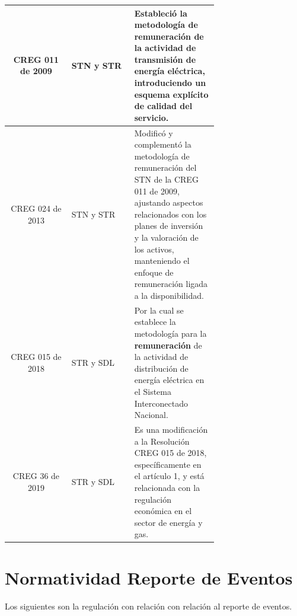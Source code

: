 \documentclass[a5paper]{book}%
\begin{document}
\begin{longtable}{|c|p{0.3\linewidth}|p{0.4\linewidth}|}
	CREG 011 de 2009 &  \ac{STN} y \ac{STR} & Estableció la metodología de remuneración de la actividad de transmisión de energía eléctrica, introduciendo un esquema explícito de calidad del servicio.\\\hline
	
	CREG 024 de 2013 &  \ac{STN} y \ac{STR}  & Modificó y complementó la metodología de remuneración del STN de la CREG 011 de 2009, ajustando aspectos relacionados con los planes de inversión y la valoración de los activos, manteniendo el enfoque de remuneración ligada a la disponibilidad.\\\hline
	
	CREG 015 de 2018& \ac{STR}  y \ac{SDL} &Por la cual se establece la metodología para la \textbf{remuneración} de la actividad de
	distribución de energía eléctrica en el Sistema Interconectado
	Nacional.\\\hline
	
	CREG 36 de 2019 & \ac{STR}  y \ac{SDL}  & Es una modificación a la Resolución CREG 015 de 2018, específicamente en el artículo 1, y está relacionada con la regulación económica en el sector de energía y gas.\\\hline
	
	
\end{longtable}


\section{Normatividad Reporte de Eventos}

Los siguientes son la regulación con relación con relación al reporte de eventos.
\end{document}
